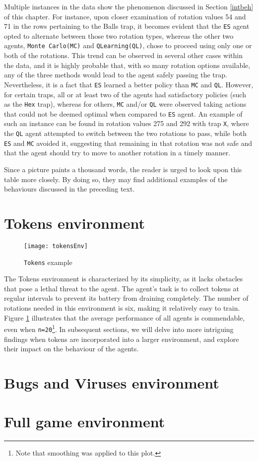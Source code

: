Multiple instances in the data show the phenomenon discussed in Section \ref{intbeh} of this chapter. For instance, upon closer examination of rotation values 54 and 71 in the rows pertaining to the Balls trap, it becomes evident that the \texttt{ES} agent opted to alternate between those two rotation types, whereas the other two agents, \texttt{Monte Carlo(MC)} and \texttt{QLearning(QL)}, chose to proceed using only one or both of the rotations. This trend can be observed in several other cases within the data, and it is highly probable that, with so many rotation options available, any of the three methods would lead to the agent safely passing the trap. Nevertheless, it is a fact that \texttt{ES} learned a better policy than \texttt{MC} and \texttt{QL}. However, for certain traps, all or at least two of the agents had satisfactory policies (such as the \texttt{Hex} trap), whereas for others, \texttt{MC} and/or \texttt{QL} were observed taking actions that could not be deemed optimal when compared to \texttt{ES} agent. An example of such an instance can be found in rotation values 275 and 292 with trap \texttt{X}, where the \texttt{QL} agent attempted to switch between the two rotations to pass, while both \texttt{ES} and \texttt{MC} avoided it, suggesting that remaining in that rotation was not safe and that the agent should try to move to another rotation in a timely manner.

Since a picture paints a thousand words, the reader is urged to look upon this table more closely. By doing so, they may find additional examples of the behaviours discussed in the preceding text. 

\section{Tokens environment}
\begin{figure}[h]
    \centering
    \texttt{[image: tokensEnv]}
    \caption{\texttt{Tokens} example}
    \label{fig:tokens}
\end{figure}

The Tokens environment is characterized by its simplicity, as it lacks obstacles that pose a lethal threat to the agent. The agent's task is to collect tokens at regular intervals to prevent its battery from draining completely. The number of rotations needed in this environment is six, making it relatively easy to train. Figure \ref{fig:tokens} illustrates that the average performance of all agents is commendable, even when \texttt{n=20}\footnote{Note that smoothing was applied to this plot.}. In subsequent sections, we will delve into more intriguing findings when tokens are incorporated into a larger environment, and explore their impact on the behaviour of the agents.

\section{Bugs and Viruses environment}
\section{Full game environment}